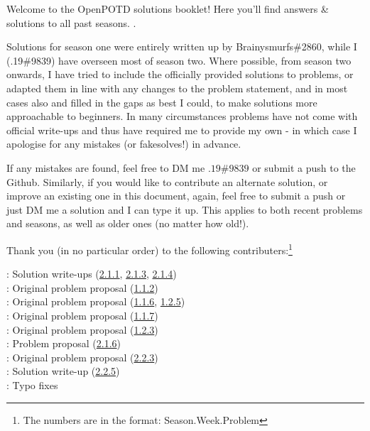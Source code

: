 Welcome to the OpenPOTD solutions booklet! Here you'll find answers \& solutions to all past seasons.\medskip
.

Solutions for season one were entirely written up by Brainysmurfs\#2860, while I (.19\#9839) have overseen most of season two. 
Where possible, from season two onwards, I have tried to include the officially provided solutions to problems, or adapted them in line with any changes to the problem statement, and in most cases also and filled in the gaps as best I could, to make solutions more approachable to beginners. 
In many circumstances problems have not come with official write-ups and thus have required me to provide my own - in which case I apologise for any mistakes (or fakesolves!) in advance.\medskip

If any mistakes are found, feel free to DM me \(.19\#9839\) or submit a push to the Github.
Similarly, if you would like to contribute an alternate solution, or improve an existing one in this document, again, feel free to submit a push or just DM me a solution and I can type it up. 
This applies to both recent problems and seasons, as well as older ones (no matter how old!).\bigskip 


Thank you (in no particular order) to the following contributers:\footnote{The numbers are in the format: Season.Week.Problem}\medskip

\Paiya: Solution write-ups (\hyperref[2-1-1]{2.1.1}, \hyperref[2-1-3]{2.1.3}, \hyperref[2-1-4]{2.1.4})\\
\Ptony: Original problem proposal (\hyperref[1-1-2]{1.1.2})\\
\Ppi: Original problem proposal (\hyperref[1-1-6]{1.1.6}, \hyperref[1-2-5]{1.2.5})\\
\Pbfan: Original problem proposal (\hyperref[1-1-7]{1.1.7})\\
\Pkiesh: Original problem proposal (\hyperref[1-2-3]{1.2.3})\\
\Pchris: Problem proposal (\hyperref[2-1-6]{2.1.6})\\
\Pkee: Original problem proposal (\hyperref[2-2-3]{2.2.3})\\
\PSlas: Solution write-up (\hyperref[2-2-5]{2.2.5})\\
\Parjun: Typo fixes

\medskip